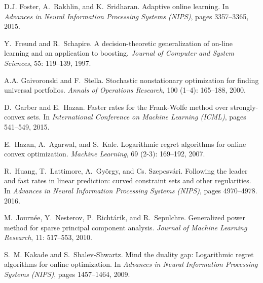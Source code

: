 \documentclass[english]{article}
\begin{document}
\begin{thebibliography}{30}
D.J. Foster, A.~Rakhlin, and K.~Sridharan.
\newblock Adaptive online learning.
\newblock In \emph{Advances in Neural Information Processing Systems (NIPS)},
  pages 3357--3365, 2015.

Y.~Freund and R.~Schapire.
\newblock A decision-theoretic generalization of on-line learning and an
  application to boosting.
\newblock \emph{Journal of Computer and System Sciences}, 55:
  119--139, 1997.

A.A. Gaivoronski and F.~Stella.
\newblock Stochastic nonstationary optimization for finding universal
  portfolios.
\newblock \emph{Annals of Operations Research}, 100 (1--4):
  165--188, 2000.

D.~Garber and E.~Hazan.
\newblock Faster rates for the {F}rank-{W}olfe method over strongly-convex sets.
\newblock In \emph{International Conference on Machine
  Learning (ICML)}, pages 541--549, 2015.

E.~Hazan, A.~Agarwal, and S.~Kale.
\newblock Logarithmic regret algorithms for online convex optimization.
\newblock \emph{Machine Learning}, 69 (2-3): 169--192, 2007.

R.~Huang, T.~Lattimore, A.~Gy\"{o}rgy, and {Cs.} Szepesv\'ari.
\newblock Following the leader and fast rates in linear prediction: curved
  constraint sets and other regularities.
\newblock In \emph{Advances in Neural Information Processing Systems (NIPS)},
  pages 4970--4978. 2016.

M.~Journ{\'{e}}e, Y.~Nesterov, P.~Richt{\'{a}}rik, and R.~Sepulchre.
\newblock Generalized power method for sparse principal component analysis.
\newblock \emph{Journal of Machine Learning Research}, 11: 517--553,
  2010.

S.~M. Kakade and S.~Shalev-Shwartz.
\newblock Mind the duality gap: Logarithmic regret algorithms for online
  optimization.
\newblock In \emph{Advances in Neural Information Processing Systems (NIPS)},
  pages 1457--1464, 2009.


\end{thebibliography}
\end{document}

